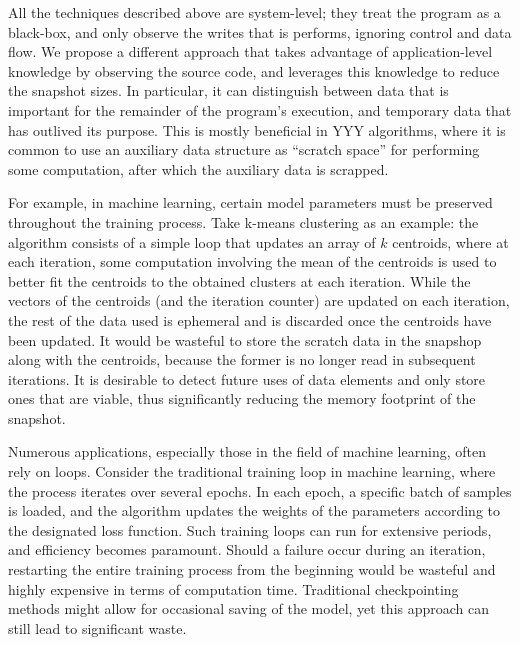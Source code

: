 
All the techniques described above are system-level; they treat the program as a black-box, and only observe the writes that is performs, ignoring control and data flow.
We propose a different approach that takes advantage of application-level knowledge by observing the source code, and leverages this knowledge to reduce the snapshot sizes.
In particular, it can distinguish between data that is important for the remainder of the program's execution, and temporary data that has outlived its purpose.
This is mostly beneficial in YYY algorithms, where it is common to use an auxiliary data structure as ``scratch space'' for performing some computation, after which the auxiliary data is scrapped.

For example, in machine learning, certain model parameters must be preserved throughout the training process. Take k-means clustering as an example: the 
algorithm consists of a simple loop that updates an array of $k$ centroids, where at each iteration, some computation involving the mean of the centroids is used to better fit the centroids to the obtained clusters at each iteration.
While the vectors of the centroids (and the iteration counter) are updated on each iteration, the rest of the data used is ephemeral and is discarded once the centroids have been updated.
It would be wasteful to store the scratch data in the snapshop along with the centroids, because the former is no longer read in subsequent iterations.
It is desirable to detect future uses of data elements and only store ones that are viable, thus significantly reducing the memory footprint of the snapshot.




Numerous applications, especially those in the field of machine learning, often rely on loops. Consider the traditional training loop in machine learning, where the process iterates over several epochs. In each epoch, a specific batch of samples is loaded, and the algorithm updates the weights of the parameters according to the designated loss function. Such training loops can run for extensive periods, and efficiency becomes paramount.
Should a failure occur during an iteration, restarting the entire training process from the beginning would be wasteful and highly expensive in terms of computation time. Traditional checkpointing methods might allow for occasional saving of the model, yet this approach can still lead to significant waste.

